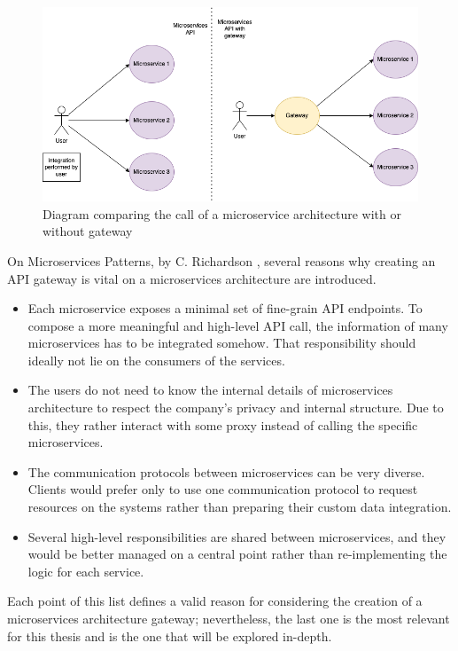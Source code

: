 \documentclass[english, 12pt, a4paper, sci, utf8, a-1b, online]{aaltothesis}
\begin{document}
\begin{figure}[h!]
    \centering
    \includegraphics[scale=0.3]{src/thesis/img/literature-review/gateway.png}
    \caption{Diagram comparing the call of a microservice architecture with or without gateway}
\end{figure}

On Microservices Patterns, by C. Richardson \cite{richardson2018microservices}, several reasons why creating an API gateway is vital on a microservices architecture are introduced.

\begin{itemize}
    \item Each microservice exposes a minimal set of fine-grain API endpoints. To compose a more meaningful and high-level API call, the information of many microservices has to be integrated somehow. That responsibility should ideally not lie on the consumers of the services.
    \item The users do not need to know the internal details of microservices architecture to respect the company's privacy and internal structure. Due to this, they rather interact with some proxy instead of calling the specific microservices.
    \item The communication protocols between microservices can be very diverse. Clients would prefer only to use one communication protocol to request resources on the systems rather than preparing their custom data integration.
    \item Several high-level responsibilities are shared between microservices, and they would be better managed on a central point rather than re-implementing the logic for each service.
\end{itemize}

Each point of this list defines a valid reason for considering the creation of a microservices architecture gateway; nevertheless, the last one is the most relevant for this thesis and is the one that will be explored in-depth.\\
\end{document}

